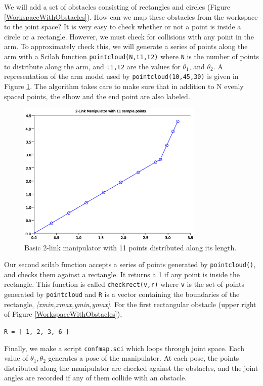 We will add a set of obstacles consisting of rectangles and circles (Figure \ref{WorkspaceWithObstacles}). 
How can we map these obstacles from the workspace to the joint space?  It is very easy to check whether or not a point is inside a circle or a rectangle.   However, we must check for collisions with any point in the arm.   To approximately check this, we will generate a series of points along the arm with a Scilab function {\tt pointcloud(N,t1,t2)} where {\tt N} is the number of points to distribute along the arm, and {\tt t1,t2} are the values for $\theta_1$, and $\theta_2$.  A representation of the arm model used by {\tt pointcloud(10,45,30)} is given in Figure \ref{TwoLinkPointCloud}.   The algorithm takes care to make sure that in addition to N evenly spaced points,  the elbow and the end point are also labeled.

\begin{figure}\centering
\includegraphics[width=3.5in]{figs08/two_link_pts.eps}
\caption{Basic 2-link manipulator with 11 points distributed along its length.}\label{TwoLinkPointCloud}
\end{figure}

Our second scilab function accepts a series of points generated by {\tt pointcloud()}, and checks them against a rectangle.  It returns a 1 if any point is inside the rectangle.  This function is called {\tt checkrect(v,r)} where {\tt v} is the set of points generated by {\tt pointcloud} and {\tt R} is a vector containing the boundaries of the rectangle, \textit{[xmin,xmax,ymin,ymax]}.  For the first rectangular obstacle (upper right of Figure \ref{WorkspaceWithObstacles}),

\begin{center}
{\tt R = [ 1, 2, 3, 6 ]}
\end{center}

Finally, we make a script {\tt confmap.sci} which loops through joint space.  Each value of $\theta_1,\theta_2$ generates a pose of the manipulator.  At each  pose, the points distributed along the manipulator are checked against the obstacles, and the joint angles are recorded if any of them collide with an obstacle.


